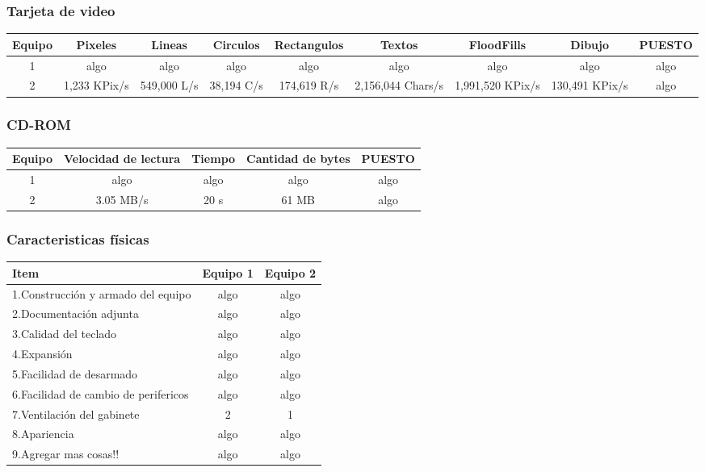\subsubsection{Tarjeta de video}
\begin{center}
\begin{tabular}{|ccccccccc|} \hline
\footnotesize\textbf{Equipo} & \footnotesize\textbf{Pixeles} & \footnotesize\textbf{Lineas} & \footnotesize\textbf{Circulos} & \footnotesize\textbf{Rectangulos} & \footnotesize\textbf{Textos} & \footnotesize\textbf{FloodFills} & \footnotesize\textbf{Dibujo} & \footnotesize\textbf{PUESTO} \\\hline
1 & algo & algo & algo & algo & algo & algo & algo & algo \\\hline
2 & 1,233 KPix/s & 549,000 L/s & 38,194 C/s & 174,619 R/s & 2,156,044 Chars/s & 1,991,520 KPix/s & 130,491 KPix/s & algo \\\hline
\end{tabular}
\end{center}

\subsubsection{CD-ROM}
\begin{center}
\begin{tabular}{|ccccc|} \hline
\footnotesize\textbf{Equipo} & \footnotesize\textbf{Velocidad de lectura} & \footnotesize\textbf{Tiempo} & \footnotesize\textbf{Cantidad de bytes} & \footnotesize\textbf{PUESTO} \\\hline
1 & algo & algo & algo & algo \\\hline
2 & 3.05 MB/s & 20 s & 61 MB & algo \\\hline
\end{tabular}
\end{center}

\subsubsection{Caracteristicas físicas}
\begin{center}
\begin{tabular}{|lcc|} \hline
\footnotesize\textbf{Item} & \footnotesize\textbf{Equipo 1} & \footnotesize\textbf{Equipo 2} \\\hline
1.Construcción y armado del equipo & algo & algo \\\hline
2.Documentación adjunta & algo & algo \\\hline
3.Calidad del teclado & algo & algo \\\hline
4.Expansión & algo & algo \\\hline
5.Facilidad de desarmado & algo & algo \\\hline
6.Facilidad de cambio de perifericos & algo & algo \\\hline
7.Ventilación del gabinete & 2 & 1 \\\hline
8.Apariencia & algo & algo \\\hline
9.Agregar mas cosas!! & algo & algo \\\hline
\end{tabular}
\end{center}